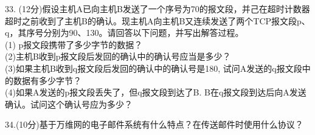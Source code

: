 33. (12分)假设主机A已向主机B发送了一个序号为70的报文段，并己在超时计数器超时之前收到了主机B的确认。现主机A向主机B又连续发送了两个TCP报文段p、q，其序号分别为90、130。请回答以下问题，并写出解答过程。 \\
(1) p报文段携带了多少字节的数据？ \\
(2)主机B收到p报文段后发回的确认中的确认号应当是多少？ \\
(3)如果主机B收到q报文段后发回的确认中的确认号是180, 试问A发送的q报文段中的数据有多少字节？ \\
(4)如果A发送的p报文段丢失了，但q报文段到达了B. B在q报文段到达后向A发送确认。试问这个确认号应为多少？

34.(10分)基于万维网的电子邮件系统有什么特点？在传送邮件时使用什么协议？